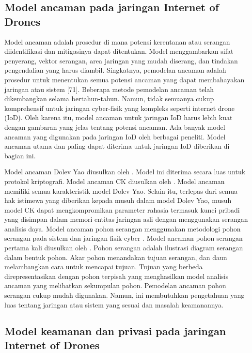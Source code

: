 \subsection{Model ancaman pada jaringan Internet of Drones}
\label{subsec:modelancaman}

Model ancaman adalah prosedur di mana potensi kerentanan atau serangan diidentifikasi dan mitigasinya dapat ditentukan. Model menggambarkan sifat penyerang, vektor serangan, area jaringan yang mudah diserang, dan tindakan pengendalian yang harus diambil. Singkatnya, pemodelan ancaman adalah prosedur untuk menentukan semua potensi ancaman yang dapat membahayakan jaringan atau sistem [71]. Beberapa metode pemodelan ancaman telah dikembangkan selama bertahun-tahun. Namun, tidak semuanya cukup komprehensif untuk jaringan cyber-fisik yang kompleks seperti internet drone (IoD). Oleh karena itu, model ancaman untuk jaringan IoD harus lebih kuat dengan gambaran yang jelas tentang potensi ancaman. Ada banyak model ancaman yang digunakan pada jaringan IoD oleh berbagai peneliti. Model ancaman utama dan paling dapat diterima untuk jaringan IoD diberikan di bagian ini.

Model ancaman Dolev Yao diusulkan oleh \citet{dolev1983security}. Model ini diterima secara luas untuk protokol kriptografi. Model ancaman CK diusulkan oleh \citet{canetti2002universally}. Model ancaman memiliki semua karakteristik model Dolev Yao. Selain itu, terlepas dari semua hak istimewa yang diberikan kepada musuh dalam model Dolev Yao, musuh model CK dapat mengkompromikan parameter rahasia termasuk kunci pribadi yang disimpan dalam memori entitas jaringan asli dengan menggunakan serangan analisis daya. Model ancaman pohon serangan menggunakan metodologi pohon serangan pada sistem dan jaringan fisik-cyber \citep{potteiger2016software}. Model ancaman pohon serangan pertama kali diusulkan oleh \citet{schneier1999attack}. Pohon serangan adalah ilustrasi diagram serangan dalam bentuk pohon. Akar pohon menandakan tujuan serangan, dan daun melambangkan cara untuk mencapai tujuan. Tujuan yang berbeda direpresentasikan dengan pohon terpisah yang menghasilkan model analisis ancaman yang melibatkan sekumpulan pohon. Pemodelan ancaman pohon serangan cukup mudah digunakan. Namun, ini membutuhkan pengetahuan yang luas tentang jaringan atau sistem yang sesuai dan masalah keamanannya.

\subsection{Model keamanan dan privasi pada jaringan Internet of Drones}
\label{subsec:modelkeamanan}

